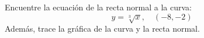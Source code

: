 \item Encuentre la ecuación de la recta normal a la curva:
$$y = \sqrt[3]{x}, \quad (-8, -2)$$
Además, trace la gráfica de la curva y la recta normal.
